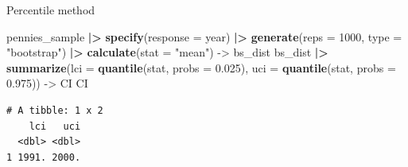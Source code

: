 \documentclass[
  ignorenonframetext,
]{beamer}
\newenvironment{Shaded}{\begin{snugshade}}{\end{snugshade}}
\newcommand{\AttributeTok}[1]{\textcolor[rgb]{0.13,0.29,0.53}{#1}}
\newcommand{\DecValTok}[1]{\textcolor[rgb]{0.00,0.00,0.81}{#1}}
\newcommand{\FloatTok}[1]{\textcolor[rgb]{0.00,0.00,0.81}{#1}}
\newcommand{\FunctionTok}[1]{\textcolor[rgb]{0.13,0.29,0.53}{\textbf{#1}}}
\newcommand{\NormalTok}[1]{#1}
\newcommand{\OtherTok}[1]{\textcolor[rgb]{0.56,0.35,0.01}{#1}}
\newcommand{\SpecialCharTok}[1]{\textcolor[rgb]{0.81,0.36,0.00}{\textbf{#1}}}
\newcommand{\StringTok}[1]{\textcolor[rgb]{0.31,0.60,0.02}{#1}}
\begin{document}
\begin{frame}[fragile]{Percentile method}
\label{percentile-method}
\small

\begin{Shaded}
\begin{Highlighting}[]
\NormalTok{pennies\_sample }\SpecialCharTok{|\textgreater{}} 
  \FunctionTok{specify}\NormalTok{(}\AttributeTok{response =}\NormalTok{ year) }\SpecialCharTok{|\textgreater{}} 
  \FunctionTok{generate}\NormalTok{(}\AttributeTok{reps =} \DecValTok{1000}\NormalTok{, }\AttributeTok{type =} \StringTok{"bootstrap"}\NormalTok{) }\SpecialCharTok{|\textgreater{}} 
  \FunctionTok{calculate}\NormalTok{(}\AttributeTok{stat =} \StringTok{"mean"}\NormalTok{) }\OtherTok{{-}\textgreater{}}\NormalTok{ bs\_dist}
\NormalTok{bs\_dist }\SpecialCharTok{|\textgreater{}} 
  \FunctionTok{summarize}\NormalTok{(}\AttributeTok{lci =} \FunctionTok{quantile}\NormalTok{(stat, }\AttributeTok{probs =} \FloatTok{0.025}\NormalTok{), }
            \AttributeTok{uci =} \FunctionTok{quantile}\NormalTok{(stat, }\AttributeTok{probs =} \FloatTok{0.975}\NormalTok{)) }\OtherTok{{-}\textgreater{}}\NormalTok{ CI}
\NormalTok{CI}
\end{Highlighting}
\end{Shaded}

\begin{verbatim}
# A tibble: 1 x 2
    lci   uci
  <dbl> <dbl>
1 1991. 2000.
\end{verbatim}

\normalsize
\end{frame}
\end{document}

